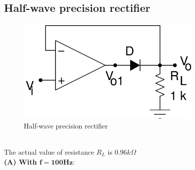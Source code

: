 \documentclass[12pt]{article}
\begin{document}
\subsection{Half-wave precision rectifier}
        \begin{figure}[H]
            \centering
            \includegraphics[width = 0.6\linewidth, height = 2in]{reports/lab3/half-rect.png}
            \caption{Half-wave precision rectifier}
        \end{figure}
        
      \\
         The actual value of resistance $R_L$ is $0.96k\Omega$
        \\
        
      \textbf{(A) With $\mathbf{f = 100Hz :}$}\\
         
\end{document}
